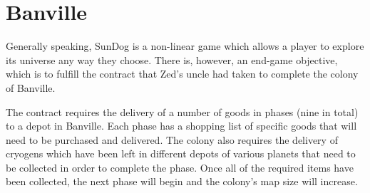 \section{Banville}

Generally speaking, SunDog is a non-linear game which allows a player
to explore its universe any way they choose.  There is, however, an
end-game objective, which is to fulfill the contract that Zed's uncle
had taken to complete the colony of Banville.

The contract requires the delivery of a number of goods in phases (nine
in total) to a depot in Banville.  Each phase has a shopping list of
specific goods that will need to be purchased and delivered.  The
colony also requires the delivery of cryogens which have been left in
different depots of various planets that need to be collected in order
to complete the phase.  Once all of the required items have been collected,
the next phase will begin and the colony's map size will increase.


